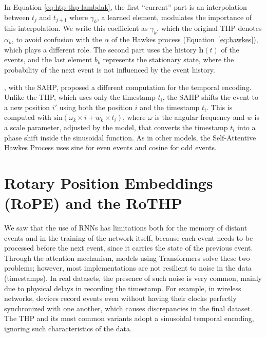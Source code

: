     In Equation \ref{eq:htp-thp-lambdak}, the first ``current'' part is an interpolation between $t_j$ and $t_{j+1}$ where $\gamma_k$, a learned element, modulates the importance of this interpolation. We write this coefficient as $\gamma_k$, which the original THP denotes $\alpha_k$, to avoid confusion with the $\alpha$ of the Hawkes process (Equation~\eqref{eq:hawkes}), which plays a different role. The second part uses the history $\mathbf{h}(t)$ of the events, and the last element $b_k$ represents the stationary state, where the probability of the next event is not influenced by the event history.

    , with the \gls{SAHP}, proposed a different computation for the temporal encoding. Unlike the THP, which uses only the timestamp $t_i$, the SAHP shifts the event to a new position $i'$ using both the position $i$ and the timestamp $t_i$. This is computed with $\mathrm{sin}(\omega_k \times i + w_k \times t_i)$, where $\omega$ is the angular frequency and $w$ is a scale parameter, adjusted by the model, that converts the timestamp $t_i$ into a phase shift inside the sinusoidal function. As in other models, the Self-Attentive Hawkes Process uses sine for even events and cosine for odd events.

\section{Rotary Position Embeddings (RoPE) and the RoTHP}\label{sec:rothp}

    We saw that the use of RNNs has limitations both for the memory of distant events and in the training of the network itself, because each event needs to be processed before the next event, since it carries the state of the previous event. Through the attention mechanism, models using Transformers solve these two problems; however, most implementations are not resilient to noise in the data (timestamps). In real datasets, the presence of such noise is very common, mainly due to physical delays in recording the timestamp. For example, in wireless networks, devices record events even without having their clocks perfectly synchronized with one another, which causes discrepancies in the final dataset. The THP and its most common variants adopt a sinusoidal temporal encoding, ignoring such characteristics of the data.

